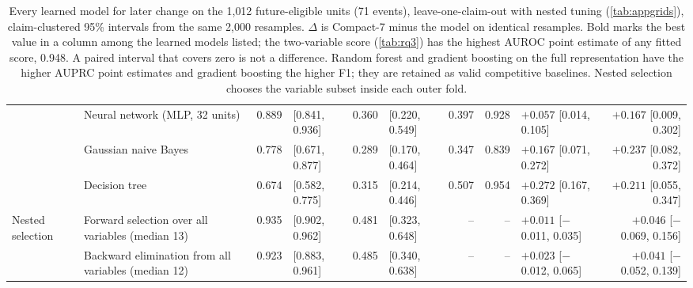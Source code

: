 \documentclass[11pt]{article}
\newcommand{\compact}{Compact-7\xspace}
\begin{document}
\begin{table}
{\begin{tabular}{@{}llrlrlrrlr@{}}
 & Neural network (MLP, 32 units) & 0.889 & [0.841, 0.936] & 0.360 & [0.220, 0.549] & 0.397 & 0.928 & $+0.057$ [0.014, 0.105] & $+0.167$ [0.009, 0.302] \\
 & Gaussian naive Bayes & 0.778 & [0.671, 0.877] & 0.289 & [0.170, 0.464] & 0.347 & 0.839 & $+0.167$ [0.071, 0.272] & $+0.237$ [0.082, 0.372] \\
 & Decision tree & 0.674 & [0.582, 0.775] & 0.315 & [0.214, 0.446] & 0.507 & 0.954 & $+0.272$ [0.167, 0.369] & $+0.211$ [0.055, 0.347] \\
\midrule
Nested selection & Forward selection over all variables (median 13) & 0.935 & [0.902, 0.962] & 0.481 & [0.323, 0.648] & -- & -- & $+0.011$ [$-$0.011, 0.035] & $+0.046$ [$-$0.069, 0.156] \\
 & Backward elimination from all variables (median 12) & 0.923 & [0.883, 0.961] & 0.485 & [0.340, 0.638] & -- & -- & $+0.023$ [$-$0.012, 0.065] & $+0.041$ [$-$0.052, 0.139] \\
\bottomrule
\end{tabular}}
\caption{Every learned model for later change on the 1{,}012 future-eligible units (71 events),
leave-one-claim-out with nested tuning (\cref{tab:appgrids}), claim-clustered 95\% intervals
from the same 2{,}000 resamples. $\Delta$ is \compact minus the model on identical resamples. Bold
marks the best value in a column among the learned models listed; the two-variable score
(\cref{tab:rq3}) has the highest AUROC point estimate of any fitted score, 0.948. A paired
interval that covers zero is not a difference. Random forest and gradient boosting on the full
representation have the higher AUPRC point estimates and gradient boosting the higher F1; they are
retained as valid competitive baselines. Nested selection
chooses the variable subset inside each outer fold.}
\label{tab:learnedfull}
\end{table}
\end{document}
